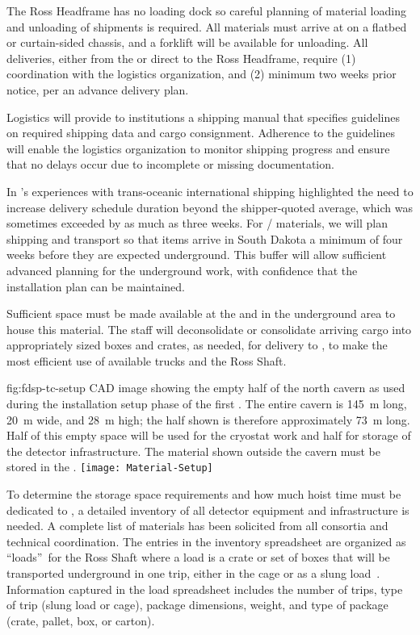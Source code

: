 The Ross Headframe has no loading dock so careful planning of material loading and unloading of shipments is required. 
All materials must arrive at  on a flatbed or curtain-sided chassis, and a forklift will be available for unloading. 
All deliveries, either from the  or direct to the Ross Headframe, require (1) coordination with the logistics organization, and (2) minimum two weeks prior notice, per an advance delivery plan.  
 
Logistics will provide to  institutions a shipping manual that  
specifies guidelines on required shipping data and cargo consignment. Adherence to the guidelines will enable the logistics organization to monitor shipping progress and ensure that no delays occur due to incomplete or missing documentation. 


In 's experiences with trans-oceanic international shipping highlighted the need to increase delivery schedule duration beyond the shipper-quoted average, which was sometimes exceeded by as much as three weeks. For / materials, we will plan shipping and transport so that items arrive in South Dakota a minimum of four weeks before they are expected underground. This buffer will allow sufficient advanced planning for the underground work, with confidence that the installation plan can be maintained.


Sufficient space must be made available at the  and in the underground area  to house this material.
The  staff will deconsolidate or consolidate arriving cargo into appropriately sized boxes and crates, as needed, for delivery to , to make the most efficient use of available trucks and the Ross Shaft. 

\begin{dunefigure}{fig:fdsp-tc-setup}
  {CAD image showing the empty half of the north cavern as used during the installation setup phase of the first .  
The entire cavern is \SI{145}{\meter} long, \SI{20}{\meter} wide, and  \SI{28}{\meter} high; the half shown is therefore approximately \SI{73}{\meter} long.  
Half of this empty space will be used for the cryostat work and half for storage of the detector infrastructure. The material shown outside the cavern must be stored in the .}
\texttt{[image: Material-Setup]}
\end{dunefigure}


To determine the storage space requirements and how much hoist time must be dedicated to , a detailed inventory of all   detector equipment and infrastructure is needed. 
A complete list of materials has been solicited from all consortia and technical coordination. 
The entries in the inventory spreadsheet are organized as \textquotedblleft loads\textquotedblright \ for the Ross Shaft where a load is a crate or set of boxes that will be transported underground in one trip, either in the cage or as a slung load~\cite{bib:docdb8426}. 
Information captured in the load spreadsheet includes the number of  
trips, type of trip (slung load or cage), package dimensions, weight, and type of package (crate, pallet, box, or carton). 

